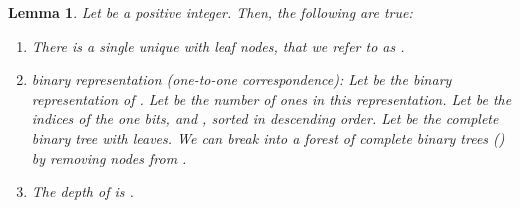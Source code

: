 \documentclass[11pt, letter]{article}
\newtheorem{lemma}{Lemma}
\begin{document}
\begin{lemma}
\label{lemma: hftproperties}
Let  be a positive integer. Then, the following are true:
\begin{enumerate}
\item \label{lmitem: hftprop-unique} There is a single unique  with  leaf nodes, that we refer to as .
\item \label{lmitem: hftprop-bin} binary representation (one-to-one correspondence): 
 Let  be the binary representation of . Let  be the
number of ones  in this representation. Let  be the indices of the one bits, and , sorted in descending order. Let  be the complete
binary tree with  leaves. We can break  into a forest of  complete binary trees () by removing  nodes from . 
\item \label{lmitem: hftprop-depth} The depth of  is .
\end{enumerate}
\end{lemma}
\end{document}

